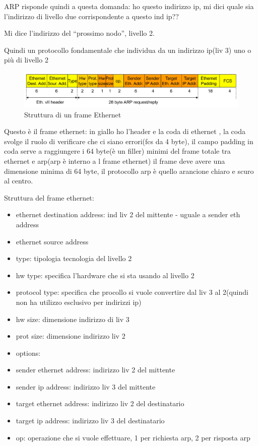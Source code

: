 ARP risponde quindi a questa domanda: ho questo indirizzo ip, mi dici quale sia l'indirizzo di livello due corrispondente a questo ind ip??

Mi dice l'indirizzo del “prossimo nodo”, livello 2.

Quindi un protocollo fondamentale che individua da un indirizzo ip(liv 3) uno o più di livello 2


\begin{figure}[h!]
    \centering
    \includegraphics[width=1\textwidth]{images/frameethernet.png}
    \caption{Struttura di un frame Ethernet}
    \label{fig:frameethernet}
\end{figure}

Questo è il frame ethernet: 
in giallo ho l'header e la coda di ethernet , la coda svolge il ruolo di verificare che ci siano errori(fcs da 4 byte), il campo padding in coda serve a raggiungere i 64 byte(è un filler) minimi del frame totale tra ethernet e arp(arp è interno a l frame ethernet)
il frame deve avere una dimensione minima di 64 byte, il protocollo arp è quello arancione chiaro e scuro al centro.

Struttura del frame ethernet:
\begin{multicols}{2}
\begin{itemize}
    \item ethernet destination address: ind liv 2 del mittente - uguale a sender eth address
    \item ethernet source address
    \item type: tipologia tecnologia del livello 2
    \item hw type: specifica l'hardware che si sta usando al livello 2
    \item protocol type: specifica che procollo si vuole convertire dal liv 3 al 2(quindi non ha utilizzo esclusivo per indirizzi ip)
    \item hw size: dimensione indirizzo di liv 3
    \item prot size: dimensione indirizzo liv 2
    \item options:
    \item sender ethernet address: indirizzo liv 2 del mittente
    \item sender ip address: indirizzo liv 3 del mittente
    \item target ethernet address: indirizzo liv 2 del destinatario
    \item target ip address: indirizzo liv 3 del destinatario
    \item op: operazione che si vuole effettuare, 1 per richiesta arp, 2 per risposta arp
\end{itemize}
\end{multicols}

